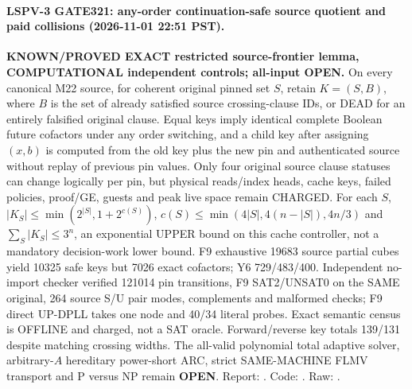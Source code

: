 \paragraph{LSPV-3 GATE321: any-order continuation-safe source quotient and paid collisions (2026-11-01 22:51 PST).}
\textbf{KNOWN/PROVED EXACT restricted source-frontier lemma, COMPUTATIONAL independent controls; all-input OPEN.} On every canonical M22 source, for coherent original pinned set $S$, retain $K=(S,B)$, where $B$ is the set of already satisfied source crossing-clause IDs, or DEAD for an entirely falsified original clause. Equal keys imply identical complete Boolean future cofactors under any order switching, and a child key after assigning $(x,b)$ is computed from the old key plus the new pin and authenticated source without replay of previous pin values. Only four original source clause statuses can change logically per pin, but physical reads/index heads, cache keys, failed policies, proof/GE, guests and peak live space remain CHARGED. For each $S$, $|K_S|\le\min(2^{|S|},1+2^{c(S)})$, $c(S)\le\min(4|S|,4(n-|S|),4n/3)$ and $\sum_S|K_S|\le3^n$, an exponential UPPER bound on this cache controller, not a mandatory decision-work lower bound. F9 exhaustive 19683 source partial cubes yield 10325 safe keys but 7026 exact cofactors; Y6 729/483/400. Independent no-import checker verified 121014 pin transitions, F9 SAT2/UNSAT0 on the SAME original, 264 source S/U pair modes, complements and malformed checks; F9 direct UP-DPLL takes one node and 40/34 literal probes. Exact semantic census is OFFLINE and charged, not a SAT oracle. Forward/reverse key totals 139/131 despite matching crossing widths. The all-valid polynomial total adaptive solver, arbitrary-$A$ hereditary power-short ARC, strict SAME-MACHINE FLMV transport and P versus NP remain \textbf{OPEN}. Report: . Code: . Raw: .
